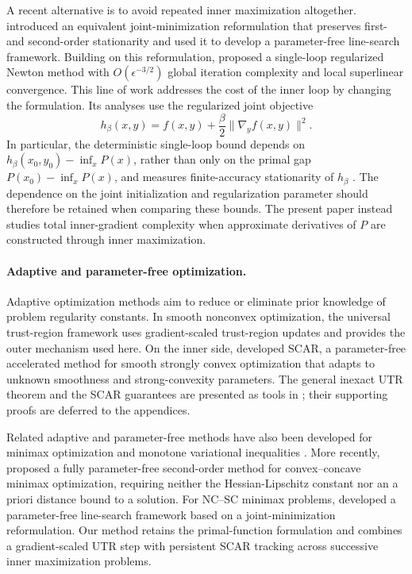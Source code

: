 \documentclass{article}
\begin{document}
A recent alternative is to avoid repeated inner maximization
altogether. \citet{ma2026linesearch} introduced an equivalent
joint-minimization reformulation that preserves first- and
second-order stationarity and used it to develop a parameter-free
line-search framework. Building on this reformulation,
\citet{ma2026singleloop} proposed a single-loop regularized Newton
method with $O(\epsilon^{-3/2})$ global iteration complexity and local
superlinear convergence. This line of work addresses the cost of the
inner loop by changing the formulation.  Its analyses use the
regularized joint objective
\[
 h_\beta(x,y)=f(x,y)+\frac\beta2\|\nabla_yf(x,y)\|^2.
\]
In particular, the deterministic single-loop bound depends on
$h_\beta(x_0,y_0)-\inf_xP(x)$, rather than only on the primal gap
$P(x_0)-\inf_xP(x)$, and measures finite-accuracy stationarity of
$h_\beta$ \citep[Theorem~3.9]{ma2026singleloop}.
The dependence on the joint initialization and regularization
parameter should therefore be retained when comparing these bounds.
The present paper instead studies total inner-gradient complexity
when approximate derivatives of $P$ are constructed through inner
maximization.

\paragraph{Adaptive and parameter-free optimization.}
Adaptive optimization methods aim to reduce or eliminate prior
knowledge of problem regularity constants. In smooth nonconvex
optimization, the universal trust-region framework
\citep{jiang2026utr} uses gradient-scaled trust-region updates and
provides the outer mechanism used here. On the inner side,
\citet{lan2026optimal} developed SCAR, a parameter-free accelerated
method for smooth strongly convex optimization that adapts to unknown
smoothness and strong-convexity parameters.
The general inexact UTR theorem and the SCAR guarantees are presented
as tools in ; their supporting proofs are
deferred to the appendices.

Related adaptive and parameter-free methods have also been developed
for minimax optimization and monotone variational inequalities
\citep{jiang2024adaptive,jiang2025generalized}.
More recently, \citet{wang2026parameterfree} proposed a fully
parameter-free second-order method for convex--concave minimax
optimization, requiring neither the Hessian-Lipschitz constant nor an
a priori distance bound to a solution. For NC--SC minimax problems,
\citet{ma2026linesearch} developed a parameter-free line-search
framework based on a joint-minimization reformulation.
Our method retains the primal-function formulation and combines a
gradient-scaled UTR step with persistent SCAR tracking across
successive inner maximization problems.
\end{document}
